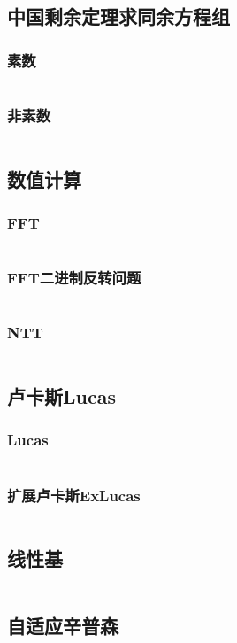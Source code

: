 \documentclass[twoside,sub3section,UTF8]{ctexart}						%
\begin{document}
	\subsection{中国剩余定理求同余方程组}
		\subsubsection{素数}
			\inputminted{c++}{"Maths/CRT(prime).cpp"}
		\subsubsection{非素数}
			\inputminted{c++}{"Maths/CRT(notprime).cpp"}
	\subsection{数值计算}
		\subsubsection{FFT}
			\inputminted{c++}{"Maths/FFT/FFT.cpp"}
		\subsubsection{FFT二进制反转问题}
			\inputminted{c++}{"Maths/FFT/FFTbitrev.cpp"}
		\subsubsection{NTT}
			\inputminted{c++}{"Maths/NTT.cpp"}
	\subsection{卢卡斯Lucas}
		\subsubsection{Lucas}
			\inputminted{c++}{"Maths/Lucas/lucas.cpp"}
		\subsubsection{扩展卢卡斯ExLucas}
			\inputminted{c++}{"Maths/exlucas.cpp"}
	\subsection{线性基}
		\inputminted{c++}{"Maths/线性基.cpp"}
	\subsection{自适应辛普森}
		\inputminted{c++}{"Maths/自适应辛普森.cpp"}
\end{document}
